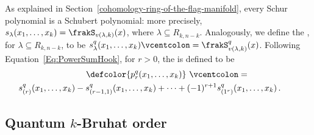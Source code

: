 As explained in Section~\ref{cohomology-ring-of-the-flag-manifold},
every Schur polynomial is a Schubert polynomial:
more precisely, $s_\lambda(x_1, \ldots, x_k) = \frakS_{v(\lambda, k)}(x)$,
where $\lambda \subseteq R_{k, n-k}$.
Analogously, we define the
,
for $\lambda \subseteq R_{k, n-k}$, to be 
${s_\lambda^q(x_1,\dotsc,x_k)} \vcentcolon= \frakS^q_{v(\lambda,k)}(x)$.
Following Equation~\eqref{Eq:PowerSumHook}, for $r>0$, the  is defined to be
\begin{multline}
    \label{Eq:Q-powerSum}
    \qquad  \defcolor{p^q_r(x_1,\dotsc,x_k)}\ \vcentcolon= \\
        s^q_{(r)}(x_1,\dotsc,x_k) - s^q_{(r-1,1)}(x_1,\dotsc,x_k) +
                   \dotsb + (-1)^{r+1} s^q_{(1^r)}(x_1,\dotsc,x_k)\,.
    \qquad
\end{multline}

\subsection{Quantum \texorpdfstring{$k$}{k}-Bruhat order}
\label{quantum-k-bruhat-order}


